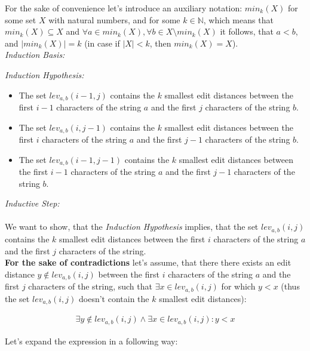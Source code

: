 \documentclass[fleqn,leqno]{article}
\begin{document}
For the sake of convenience let's introduce an auxiliary notation: $min_k(X)$ for some set $X$ with natural numbers, and for some $k \in \mathbb{N}$, which means that $min_k(X) \subseteq X$ and $\forall a \in min_k(X), \forall b \in X \setminus min_k(X)$ it follows, that $a < b$, and $|min_k(X)|=k$ (in case if $|X| < k$, then $min_k(X) = X$). \\

\textit{Induction Basis:}

\textit{Induction Hypothesis:}
\begin{itemize}
	\item The set $lev_{a,b}(i - 1, j)$ contains the $k$ smallest edit distances between the first $i - 1$ characters of the string $a$ and the first $j$ characters of the string $b$.
	\item The set $lev_{a,b}(i, j - 1)$ contains the $k$ smallest edit distances between the first $i$ characters of the string $a$ and the first $j - 1$ characters of the string $b$.
	\item The set $lev_{a,b}(i - 1, j - 1)$ contains the $k$ smallest edit distances between the first $i - 1$ characters of the string $a$ and the first $j - 1$ characters of the string $b$.
\end{itemize}

\textit{Inductive Step:} \\ \\
We want to show, that the \textit{Induction Hypothesis} implies, that the set $lev_{a,b}(i, j)$ contains the $k$ smallest edit distances between the first $i$ characters of the string $a$ and the first $j$ characters of the string. \\
\textbf{For the sake of contradictions} let's assume, that there there exists an edit distance $y \not \in lev_{a,b}(i, j)$ between the first $i$ characters of the string $a$ and the first $j$ characters of the string, such that $\exists x \in lev_{a,b}(i, j)$ for which $y < x$ (thus the set $lev_{a,b}(i, j)$ doesn't contain the $k$ smallest edit distances):

\begin{equation*}
\begin{split}
	\exists y \not \in lev_{a,b}(i, j) \wedge \exists x \in lev_{a,b}(i, j) : y < x
\end{split}
\end{equation*}

Let's expand the expression in a following way:
\end{document}
